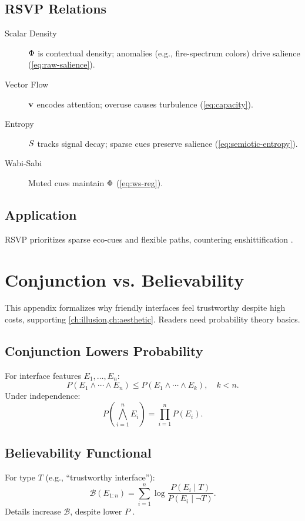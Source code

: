 {{{{{{{{{{{{{{{{{{\section{RSVP Relations}
\label{sec:rsvp-relations}
\begin{description}
  \item[Scalar Density] \(\Phi\) is contextual density; anomalies (e.g., fire-spectrum colors) drive salience (\cref{eq:raw-salience}).
  \item[Vector Flow] \(\mathbf{v}\) encodes attention; overuse causes turbulence (\cref{eq:capacity}).
  \item[Entropy] \(S\) tracks signal decay; sparse cues preserve salience (\cref{eq:semiotic-entropy}).
  \item[Wabi-Sabi] Muted cues maintain \(\Phi\) (\cref{eq:ws-reg}).
\end{description}

\section{Application}
\label{sec:rsvp-application}
RSVP prioritizes sparse eco-cues and flexible paths, countering enshittification \citep{doctorow2022}.

\chapter{Conjunction vs. Believability}
\label{app:conjunction}

This appendix formalizes why friendly interfaces feel trustworthy despite high costs, supporting \cref{ch:illusion,ch:aesthetic}. Readers need probability theory basics.

\section{Conjunction Lowers Probability}
\label{sec:conj-prob}
For interface features \(E_1, \dots, E_n\):
\begin{equation}
\label{eq:conj-prob}
P(E_1 \land \cdots \land E_n) \leq P(E_1 \land \cdots \land E_k), \quad k < n.
\end{equation}
Under independence:
\begin{equation}
\label{eq:conj-indep}
P(\bigwedge_{i=1}^n E_i) = \prod_{i=1}^n P(E_i).
\end{equation}

\section{Believability Functional}
\label{sec:conj-believability}
For type \(T\) (e.g., \textquotedblleft trustworthy interface\textquotedblright):
\begin{equation}
\label{eq:believability-functional}
\mathcal{B}(E_{1:n}) = \sum_{i=1}^n \log \frac{P(E_i \mid T)}{P(E_i \mid \neg T)}.
\end{equation}
Details increase \(\mathcal{B}\), despite lower \(P\) \citep{tversky1983}.

}}}}}}}}}}}}}}}}}}
